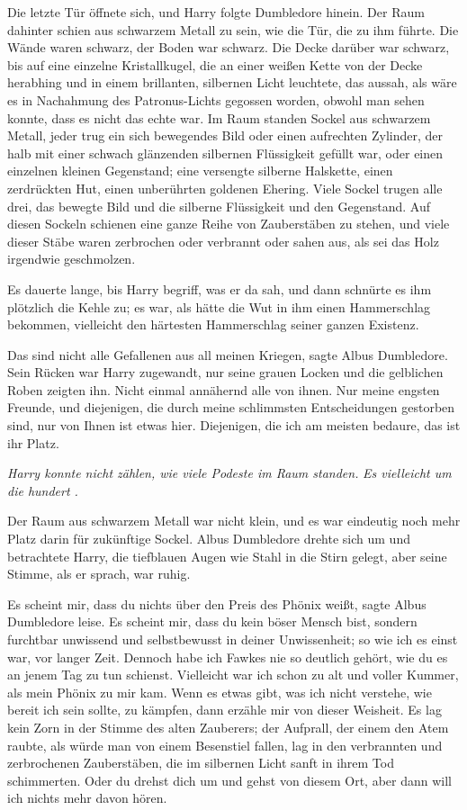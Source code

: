 Die letzte Tür öffnete sich, und Harry folgte Dumbledore hinein. Der Raum
dahinter schien aus schwarzem Metall zu sein, wie die Tür, die zu ihm führte.
Die Wände waren schwarz, der Boden war schwarz. Die Decke darüber war schwarz,
bis auf eine einzelne Kristallkugel, die an einer weißen Kette von der Decke
herabhing und in einem brillanten, silbernen Licht leuchtete, das aussah, als
wäre es in Nachahmung des Patronus-Lichts gegossen worden, obwohl man sehen
konnte, dass es nicht das echte war. Im Raum standen Sockel aus schwarzem
Metall, jeder trug ein sich bewegendes Bild oder einen aufrechten Zylinder, der
halb mit einer schwach glänzenden silbernen Flüssigkeit gefüllt war, oder einen
einzelnen kleinen Gegenstand; eine versengte silberne Halskette, einen
zerdrückten Hut, einen unberührten goldenen Ehering. Viele Sockel trugen alle
drei, das bewegte Bild und die silberne Flüssigkeit und den Gegenstand. Auf
diesen Sockeln schienen eine ganze Reihe von Zauberstäben zu stehen, und viele
dieser Stäbe waren zerbrochen oder verbrannt oder sahen aus, als sei das Holz
irgendwie geschmolzen.

Es dauerte lange, bis Harry begriff, was er da sah, und dann schnürte es ihm
plötzlich die Kehle zu; es war, als hätte die Wut in ihm einen Hammerschlag
bekommen, vielleicht den härtesten Hammerschlag seiner ganzen Existenz.

\glqq{}Das sind nicht alle Gefallenen aus all meinen Kriegen\grqq{}, sagte Albus
Dumbledore. Sein Rücken war Harry zugewandt, nur seine grauen Locken und die
gelblichen Roben zeigten ihn. \glqq{}Nicht einmal annähernd alle von ihnen. Nur
meine engsten Freunde, und diejenigen, die durch meine schlimmsten
Entscheidungen gestorben sind, nur von Ihnen ist etwas hier. Diejenigen, die ich
am meisten bedaure, das ist ihr Platz.\grqq{}

\emph{Harry konnte nicht zählen, wie viele Podeste im Raum standen.} \emph{Es
vielleicht um die hundert .}

Der Raum aus schwarzem Metall war nicht klein, und es war eindeutig noch mehr
Platz darin für zukünftige Sockel. Albus Dumbledore drehte sich um und
betrachtete Harry, die tiefblauen Augen wie Stahl in die Stirn gelegt, aber
seine Stimme, als er sprach, war ruhig.

\glqq{}Es scheint mir, dass du nichts über den Preis des Phönix weißt\grqq{},
sagte Albus Dumbledore leise. \glqq{}Es scheint mir, dass du kein böser Mensch
bist, sondern furchtbar unwissend und selbstbewusst in deiner Unwissenheit; so
wie ich es einst war, vor langer Zeit. Dennoch habe ich Fawkes nie so deutlich
gehört, wie du es an jenem Tag zu tun schienst. Vielleicht war ich schon zu alt
und voller Kummer, als mein Phönix zu mir kam. Wenn es etwas gibt, was ich nicht
verstehe, wie bereit ich sein sollte, zu kämpfen, dann erzähle mir von dieser
Weisheit.\grqq{} Es lag kein Zorn in der Stimme des alten Zauberers; der
Aufprall, der einem den Atem raubte, als würde man von einem Besenstiel fallen,
lag in den verbrannten und zerbrochenen Zauberstäben, die im silbernen Licht
sanft in ihrem Tod schimmerten. \glqq{}Oder du drehst dich um und gehst von
diesem Ort, aber dann will ich nichts mehr davon hören.\grqq{}

